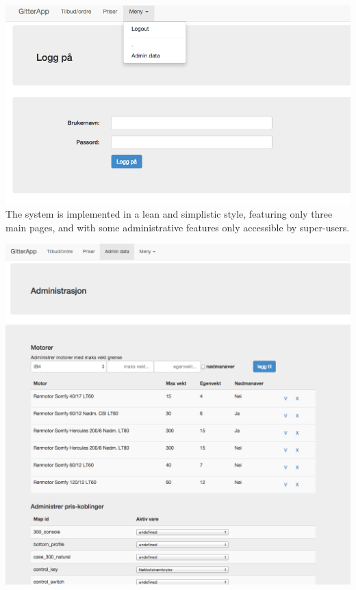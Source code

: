 \documentclass[11pt]{article}
\begin{document}
\vspace{2\baselineskip}
\noindent
\includegraphics[width=\textwidth]{portfolio-graphics/GA-1.png}    
The system is implemented in a lean and simplistic style, featuring only three main pages, and with some administrative features only accessible by super-users.

\vspace{2\baselineskip}
\noindent
\includegraphics[width=\textwidth]{portfolio-graphics/GA-2.png}    
\end{document}
